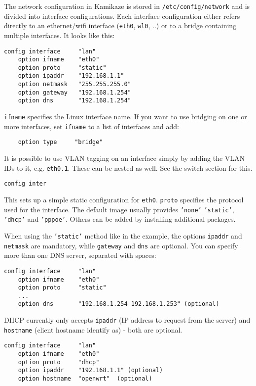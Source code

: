 The network configuration in Kamikaze is stored in \texttt{/etc/config/network}
and is divided into interface configurations.
Each interface configuration either refers directly to an ethernet/wifi
interface (\texttt{eth0}, \texttt{wl0}, ..) or to a bridge containing multiple interfaces.
It looks like this:

\begin{Verbatim}
config interface     "lan"
    option ifname    "eth0"
    option proto     "static"
    option ipaddr    "192.168.1.1"
    option netmask   "255.255.255.0"
    option gateway   "192.168.1.254"
    option dns       "192.168.1.254"
\end{Verbatim}

\texttt{ifname} specifies the Linux interface name.
If you want to use bridging on one or more interfaces, set \texttt{ifname} to a list
of interfaces and add:
\begin{Verbatim}
    option type     "bridge"
\end{Verbatim}

It is possible to use VLAN tagging on an interface simply by adding the VLAN IDs
to it, e.g. \texttt{eth0.1}. These can be nested as well. See the switch section for
this.

\begin{Verbatim}
config inter
\end{Verbatim}

This sets up a simple static configuration for \texttt{eth0}. \texttt{proto} specifies the
protocol used for the interface. The default image usually provides \texttt{'none'}
\texttt{'static'}, \texttt{'dhcp'} and \texttt{'pppoe'}. Others can be added by installing additional
packages.

When using the \texttt{'static'} method like in the example, the  options \texttt{ipaddr} and
\texttt{netmask} are mandatory, while \texttt{gateway} and \texttt{dns} are optional.
You can specify more than one DNS server, separated with spaces:

\begin{Verbatim}
config interface     "lan"
    option ifname    "eth0"
    option proto     "static"
    ...
    option dns       "192.168.1.254 192.168.1.253" (optional)
\end{Verbatim}

DHCP currently only accepts \texttt{ipaddr} (IP address to request from the server)
and \texttt{hostname} (client hostname identify as) - both are optional.

\begin{Verbatim}
config interface     "lan"
    option ifname    "eth0"
    option proto     "dhcp"
    option ipaddr    "192.168.1.1" (optional)
    option hostname  "openwrt"	(optional)
\end{Verbatim}

